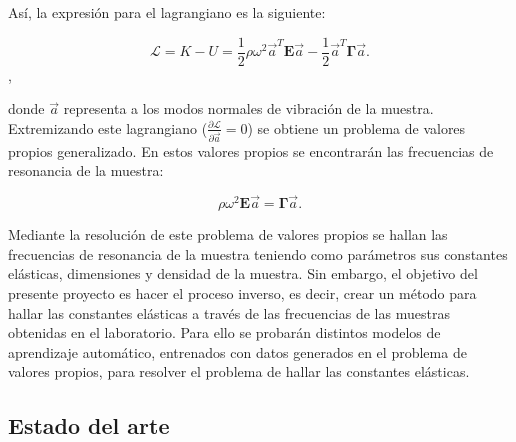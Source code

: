 \documentclass[12pt]{article}
\begin{document}
Así, la expresión para el lagrangiano es la siguiente: 

\begin{equation}
	\mathcal{L} = K - U = \frac{1}{2} \rho \omega^2 \vec{a}^{T}\bm{E}\vec{a} - \frac{1}{2} \vec{a}^{T}\bm{\Gamma}\vec{a}.
\end{equation},

donde $\vec{a}$ representa a los modos normales de vibración de la muestra. Extremizando este lagrangiano ($\frac{\partial \mathcal{L}}{\partial \vec{a}} = 0$) se obtiene un problema de valores propios generalizado. En estos valores propios se encontrarán las frecuencias de resonancia de la muestra:

\begin{equation}
	\rho \omega^2 \bm{E} \vec{a} = \bm{\Gamma} \vec{a}.
	\label{eq:eigenvalue-problem}
\end{equation}

Mediante la resolución de este problema de valores propios se hallan las frecuencias de resonancia de la muestra teniendo como parámetros sus constantes elásticas, dimensiones y densidad de la muestra. Sin embargo, el objetivo del presente proyecto es hacer el proceso inverso, es decir, crear un método para hallar las constantes elásticas a través de las frecuencias de las muestras obtenidas en el laboratorio. Para ello se probarán distintos modelos de aprendizaje automático, entrenados con datos generados en el problema de valores propios, para resolver el problema de hallar las constantes elásticas. 

\subsection{Estado del arte}
\end{document}
